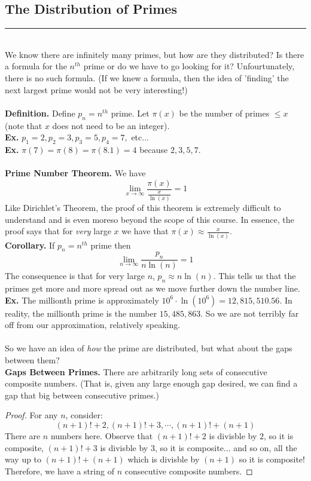 \documentclass[class=article, crop=false]{standalone}
\begin{document}
\subsection{The Distribution of Primes}
\rule{\textwidth}{1pt}\\
We know there are infinitely many primes, but how are they distributed? Is there a formula for the $n^{th}$
prime or do we have to go looking for it? Unfourtunately, there is no such formula. (If we knew a formula,
then the idea of 'finding' the next largest prime would not be very interesting!)\\\\
\textbf{Definition.} Define $p_n=n^{th}$ prime. Let $\pi(x)$ be the number of primes $\leq x$ (note that
$x$ does not need to be an integer).\\
\textbf{Ex.} $p_1=2, p_2=3, p_3=5, p_4=7,$ etc...\\
\textbf{Ex.} $\pi(7)=\pi(8)=\pi(8.1)=4$ because $2,3,5,7$.\\\\
\textbf{Prime Number Theorem.} We have $$\lim_{x\rightarrow\infty}\frac{\pi(x)}{\frac{x}{\ln(x)}}=1$$
Like Dirichlet's Theorem, the proof of this theorem is extremely difficult to understand and is even moreso
beyond the scope of this course. In essence, the proof says that for \emph{very} large $x$ we have that
$\pi(x)\approx\frac{x}{\ln(x)}$.\\
\textbf{Corollary.} If $p_n= n^{th}$ prime then $$\lim_{n\rightarrow\infty}\frac{p_n}{n\ln(n)}=1$$
The consequence is that for very large $n$, $p_n\approx n\ln(n)$. This tells us that the primes get more and
more spread out as we move further down the number line.\\
\textbf{Ex.} The millionth prime is approximately $10^6\cdot \ln(10^6)=12,815,510.56$. In reality, the millionth
prime is the number $15,485,863$. So we are not terribly far off from our approximation, relatively speaking.\\\\
\noindent So we have an idea of \emph{how} the prime are distributed, but what about the gaps between them?\\
\textbf{Gaps Between Primes.} There are arbitrarily long sets of consecutive composite numbers. (That is, given any
large enough gap desired, we can find a gap that big between consecutive primes.)
\begin{proof}
	For any $n$, consider: $$(n+1)!+2, (n+1)!+3, \cdots, (n+1)!+(n+1)$$
	There are $n$ numbers here. Observe that $(n+1)!+2$ is divisble by $2$, so it is composite,
	$(n+1)!+3$ is divisble by $3$, so it is composite... and so on, all the way up to $(n+1)! + (n+1)$
	which is divisble by $(n+1)$ so it is composite! Therefore, we have a string of $n$ consecutive composite numbers.
\end{proof}
\end{document}
